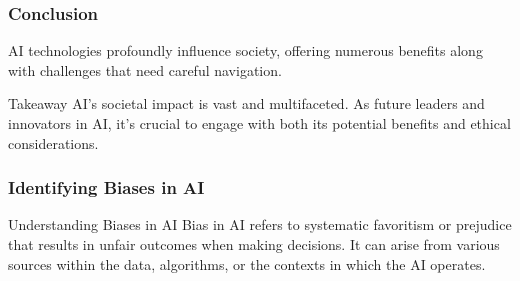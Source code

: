 \documentclass[aspectratio=169]{beamer}
\begin{document}
\begin{frame}[fragile]
    \frametitle{Conclusion}
    AI technologies profoundly influence society, offering numerous benefits along with challenges that need careful navigation. 

    \begin{block}{Takeaway}
        AI's societal impact is vast and multifaceted. As future leaders and innovators in AI, it's crucial to engage with both its potential benefits and ethical considerations.
    \end{block}
\end{frame}

\begin{frame}[fragile]
  \frametitle{Identifying Biases in AI}
  \begin{block}{Understanding Biases in AI}
    Bias in AI refers to systematic favoritism or prejudice that results in unfair outcomes when making decisions. It can arise from various sources within the data, algorithms, or the contexts in which the AI operates.
  \end{block}
\end{frame}
\end{document}
